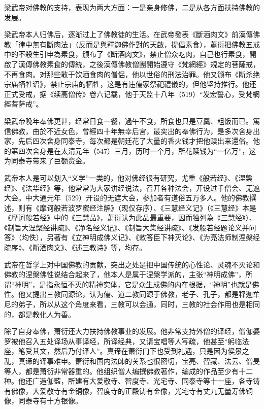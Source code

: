 梁武帝对佛教的支持，表现为两大方面：一是亲身修佛，二是从各方面扶持佛教的发展。

梁武帝本人归佛后，逐渐过上了佛教徒的生活。在武帝發表《斷酒肉文》前漢傳佛教「律中無有斷肉法」（反而是與釋迦佛作對的天啟，提倡素食），蕭衍把佛教五戒中的不殺生引申為素食，颁布了《断酒肉文》，禁止僧众吃肉，自己也行素食，開啟了漢傳佛教素食的傳統，之後漢傳佛教僧團開始遵守《梵網經》規定的菩薩戒，不再食肉。对那些敢于饮酒食肉的僧侶，他以世俗的刑法治罪。他又颁布《断杀绝宗庙牺牲诏》，禁止宗庙的牺牲，这是有违儒家祭祀禮儀的，但他坚持推行。他还正式受戒，据《续高僧传》卷六记载，他于天监十八年（519）“发宏誓心，受梵網經菩萨戒”。

梁武帝晚年奉佛更甚，经常日食一餐，過午不食，所食也只是豆羹、粗饭而已。篤信佛教，由於不近女色，曾經四十年無幸后宮，最突出的奉佛行为，是多次舍身出家，先后四次舍身同泰寺，每次都是朝廷花了大量的香火钱才把他赎出来還俗。他的第四次舍身是在太清元年（547）三月，历时一个月，所花赎钱为“一亿万”，这为同泰寺带来了巨额资金。

武帝本人是可以划入“义学”一类的，他对佛经很有研究，尤重《般若经》、《涅槃经》、《法华经》等，他常常为大家讲经说法，召开各种法会，开设过千僧会、无遮大会。中大通元年（529）开设的无遮大会，参加者有道俗五万多人。他的佛教撰述，则有《摩诃般若波罗蜜经注解》（现仅存序）、《三慧经义记》（《三慧经》本是《摩诃般若经》中的《三慧品》，萧衍认为此品最重要，因而独列為《三慧经》）、《制旨大涅槃经讲疏》、《净名经义记》、《制旨大集经讲疏》、《发般若经题论义并问答》（均佚），另著有《立神明成佛义记》、《敕答臣下神灭论》、《为亮法师制涅槃经疏序》、《断酒肉文》、《述三教诗》等，均存。

武帝在哲学上对中国佛教的贡献，突出之处是把中国传统的心性论、灵魂不灭论和佛教的涅槃佛性说结合起来了，他本人是属于涅槃学派的，主张“神明成佛”，所谓“神明”，是指永恒不灭的精神实体，它是众生成佛的内在根据，“神明”也就是佛性。他又提出三教同源论，认为儒、道二教同源于佛教，老子、孔子，都是释迦牟尼的弟子，所以从这个角度来看，三教可以会通，同时，三教的社会作用也是相同的，都是教化人为善。

除了自身奉佛，萧衍还大力扶持佛教事业的发展。他非常支持外僧的译经，僧伽婆罗被他召入五处译场从事译经，所译经典，又请宝唱等人写疏，他甚至“躬临法座，笔受其文，然后乃付译人”。真谛在萧衍门下也受到礼遇，只是因为侯景之乱，真谛的译事难申。萧衍和国内法師的关系也很密切，宝亮、智藏、法云、僧旻等人，都是萧衍非常器重的。他组织僧人编撰佛教著作，编成的作品至少有十二种。他还广造伽藍，所建有大爱敬寺、智度寺、光宅寺、同泰寺等十一座，各寺铸有佛像，大爱敬寺有金铜像，智度寺的正殿铸有金像，光宅寺有丈九无量寿佛铜像，同泰寺有十方银像。

